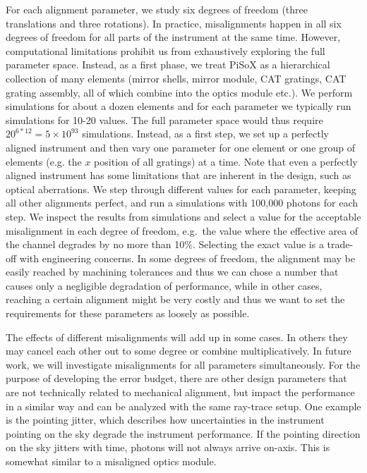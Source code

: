 \documentclass[]{spie}  %
\begin{document}
For each alignment parameter, we study six degrees of freedom (three
translations and three rotations). In practice, misalignments happen
in all six degrees of freedom for all parts of the instrument at the
same time. However, computational limitations prohibit us from
exhaustively exploring the full parameter space. Instead, as a first
phase, we treat PiSoX as a hierarchical collection of many elements
(mirror shells, mirror module, CAT gratings, CAT grating assembly, all
of which combine into the optics module etc.). We perform simulations
for about a dozen elements and for each parameter we typically run
simulations for 10-20 values. The full parameter space would thus
require $20^{6*12}=5\times 10^{93}$ simulations. Instead, as a first
step, we set up a perfectly aligned instrument and then vary one
parameter for one element or one group of elements (e.g. the $x$
position of all gratings) at a time. Note that even a perfectly
aligned instrument has some limitations that are inherent in the
design, such as optical aberrations. We step through different values
for each parameter, keeping all other alignments perfect, and run a
simulations with 100,000 photons for each step. We inspect the results
from simulations and select a value for the acceptable misalignment in
each degree of freedom, e.g.\ the value where the effective area of the
channel degrades by no more than 10\%. Selecting the exact value is a
trade-off with engineering concerns. In some degrees of freedom, the
alignment may be easily reached by machining tolerances and thus we
can chose a number that causes only a negligible degradation of
performance, while in other cases, reaching a certain alignment might
be very costly and thus we want to set the requirements for these
parameters as loosely as possible.

The effects of different misalignments will add up in some cases. In others they may cancel each other out to some
degree or combine multiplicatively. In future work, we will
investigate misalignments for all parameters simultaneously.
For the purpose of developing the error budget, there are other design
parameters that are not technically related to mechanical alignment, but
impact the performance in a similar way and can be analyzed with the
same ray-trace setup. One example is the pointing jitter, which
describes how uncertainties in the instrument pointing on the sky
degrade the instrument performance. If the pointing direction on the
sky jitters with time, photons will not always arrive on-axis. This is
somewhat similar to a misaligned optics module.
\end{document}
